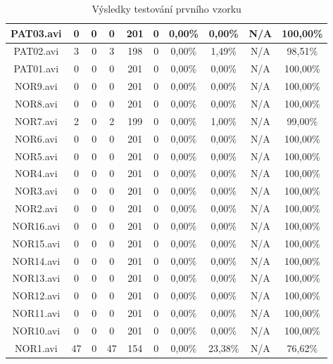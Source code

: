 \begin{table}[h]
\begin{adjustwidth}{-.5in}{-.5in}
\begin{tabular}{|c|c|c|c|c|c|c|c|c|c|}
		PAT03.avi & 0 & 0 & 0 & 201 & 0 & 0,00\% & 0,00\% & N/A & 100,00\% \\ \hline
		PAT02.avi & 3 & 0 & 3 & 198 & 0 & 0,00\% & 1,49\% & N/A & 98,51\% \\ \hline
		PAT01.avi & 0 & 0 & 0 & 201 & 0 & 0,00\% & 0,00\% & N/A & 100,00\% \\ \hline
		NOR9.avi & 0 & 0 & 0 & 201 & 0 & 0,00\% & 0,00\% & N/A & 100,00\% \\ \hline
		NOR8.avi & 0 & 0 & 0 & 201 & 0 & 0,00\% & 0,00\% & N/A & 100,00\% \\ \hline
		NOR7.avi & 2 & 0 & 2 & 199 & 0 & 0,00\% & 1,00\% & N/A & 99,00\% \\ \hline
		NOR6.avi & 0 & 0 & 0 & 201 & 0 & 0,00\% & 0,00\% & N/A & 100,00\% \\ \hline
		NOR5.avi & 0 & 0 & 0 & 201 & 0 & 0,00\% & 0,00\% & N/A & 100,00\% \\ \hline
		NOR4.avi & 0 & 0 & 0 & 201 & 0 & 0,00\% & 0,00\% & N/A & 100,00\% \\ \hline
		NOR3.avi & 0 & 0 & 0 & 201 & 0 & 0,00\% & 0,00\% & N/A & 100,00\% \\ \hline
		NOR2.avi & 0 & 0 & 0 & 201 & 0 & 0,00\% & 0,00\% & N/A & 100,00\% \\ \hline
		NOR16.avi & 0 & 0 & 0 & 201 & 0 & 0,00\% & 0,00\% & N/A & 100,00\% \\ \hline
		NOR15.avi & 0 & 0 & 0 & 201 & 0 & 0,00\% & 0,00\% & N/A & 100,00\% \\ \hline
		NOR14.avi & 0 & 0 & 0 & 201 & 0 & 0,00\% & 0,00\% & N/A & 100,00\% \\ \hline
		NOR13.avi & 0 & 0 & 0 & 201 & 0 & 0,00\% & 0,00\% & N/A & 100,00\% \\ \hline
		NOR12.avi & 0 & 0 & 0 & 201 & 0 & 0,00\% & 0,00\% & N/A & 100,00\% \\ \hline
		NOR11.avi & 0 & 0 & 0 & 201 & 0 & 0,00\% & 0,00\% & N/A & 100,00\% \\ \hline
		NOR10.avi & 0 & 0 & 0 & 201 & 0 & 0,00\% & 0,00\% & N/A & 100,00\% \\ \hline
		NOR1.avi & 47 & 0 & 47 & 154 & 0 & 0,00\% & 23,38\% & N/A & 76,62\% \\ \hline
	\end{tabular}
	\caption{Výsledky testování prvního vzorku}
	\label{tab:vyslekdy_1}
	\end{adjustwidth}
\end{table}

